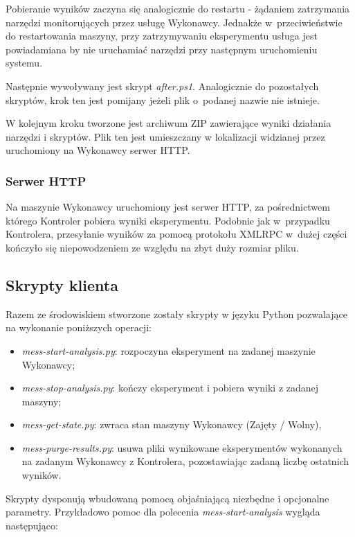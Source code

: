 \documentclass[a4paper,12pt,oneside]{article}
\begin{document}
\begin{itemize}
		Pobieranie wyników zaczyna się analogicznie do restartu - żądaniem zatrzymania narzędzi monitorujących przez usługę Wykonawcy. Jednakże w~przeciwieństwie do restartowania maszyny, przy zatrzymywaniu eksperymentu usługa jest powiadamiana by nie uruchamiać narzędzi przy następnym uruchomieniu systemu.
		
		Następnie wywoływany jest skrypt \textit{after.ps1}. Analogicznie do pozostałych skryptów, krok ten jest pomijany jeżeli plik o~podanej nazwie nie istnieje.
		
		W kolejnym kroku tworzone jest archiwum ZIP zawierające wyniki działania narzędzi i skryptów. Plik ten jest umieszczany w lokalizacji widzianej przez uruchomiony na Wykonawcy serwer HTTP. 
	\end{itemize}
	
	\subsubsection{Serwer HTTP}
	Na maszynie Wykonawcy uruchomiony jest serwer HTTP, za pośrednictwem którego Kontroler pobiera wyniki eksperymentu. Podobnie jak w~przypadku Kontrolera, przesyłanie wyników za pomocą protokołu XMLRPC w~dużej części kończyło się niepowodzeniem ze względu na zbyt duży rozmiar pliku.
			 			 
	\subsection{Skrypty klienta}
	Razem ze środowiskiem stworzone zostały skrypty w języku Python pozwalające na wykonanie poniższych operacji:
	\begin{itemize}
		\item \textit{mess-start-analysis.py}: rozpoczyna eksperyment na zadanej maszynie Wykonawcy;
		\item \textit{mess-stop-analysis.py}: kończy eksperyment i pobiera wyniki z zadanej maszyny;
		\item \textit{mess-get-state.py}: zwraca stan maszyny Wykonawcy (Zajęty / Wolny),
		\item \textit{mess-purge-results.py}: usuwa pliki wynikowane eksperymentów wykonanych na zadanym Wykonawcy z Kontrolera, pozostawiając zadaną liczbę ostatnich wyników.
	\end{itemize}
	
	Skrypty dysponują wbudowaną pomocą objaśniającą niezbędne i opcjonalne parametry. Przykładowo pomoc dla polecenia \textit{mess-start-analysis} wygląda następująco:
	
\end{document}
